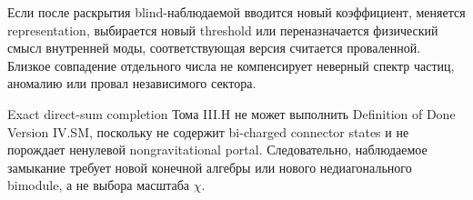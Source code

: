 \begin{nogocriterion}
Если после раскрытия blind-наблюдаемой вводится новый коэффициент, меняется
representation, выбирается новый threshold или переназначается физический
смысл внутренней моды, соответствующая версия считается проваленной. Близкое
совпадение отдельного числа не компенсирует неверный спектр частиц,
аномалию или провал независимого сектора.
\end{nogocriterion}

\begin{proposition}
Exact direct-sum completion Тома III.H не может выполнить Definition of Done
Version IV.SM, поскольку не содержит bi-charged connector states и не
порождает ненулевой nongravitational portal. Следовательно, наблюдаемое
замыкание требует новой конечной алгебры или нового недиагонального
bimodule, а не выбора масштаба \(\chi\).
\end{proposition}